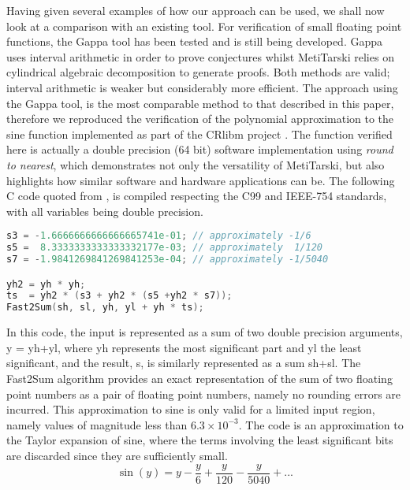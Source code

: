 \documentclass{fac}
\begin{document}
Having given several examples of how our approach can be used, we shall now look at a comparison with an existing tool. For verification of small floating point functions, the Gappa tool \cite{de2006assisted,boldo2009combining} has been tested and is still being developed. Gappa uses interval arithmetic in order to prove conjectures whilst MetiTarski relies on cylindrical algebraic decomposition to generate proofs. Both methods are valid; interval arithmetic is weaker but considerably more efficient. The approach using the Gappa tool, is the most comparable method to that described in this paper, therefore we reproduced the verification of the polynomial approximation to the sine function implemented as part of the CRlibm project \cite{daramy2009cr,5483294}. The function verified here is actually a double precision (64 bit) software implementation using \textit{round to nearest}, which demonstrates not only the versatility of MetiTarski, but also highlights how similar software and hardware applications can be. The following C code quoted from \cite{5483294}, is compiled respecting the C99 and IEEE-754 standards, with all variables being double precision. 

\begin{lstlisting}[language=C]
s3 = -1.6666666666666665741e-01; // approximately -1/6
s5 =  8.3333333333333332177e-03; // approximately  1/120
s7 = -1.9841269841269841253e-04; // approximately -1/5040

yh2 = yh * yh;
ts  = yh2 * (s3 + yh2 * (s5 +yh2 * s7));
Fast2Sum(sh, sl, yh, yl + yh * ts);
\end{lstlisting}

In this code, the input is represented as a sum of two double precision arguments, y = yh+yl, where yh represents the most significant part and yl the least significant, and the result, s, is similarly represented as a sum sh+sl. The Fast2Sum algorithm provides an exact representation of the sum of two floating point numbers as a pair of floating point numbers, namely no rounding errors are incurred. This approximation to sine is only valid for a limited input region, namely values of magnitude less than $6.3\times 10^{-3}$. The code is an approximation to the Taylor expansion of sine, where the terms involving the least significant bits are discarded since they are sufficiently small. 
\begin{equation}
    \sin{(y)} = y - \frac{y}{6} + \frac{y}{120} - \frac{y}{5040} + ... 
\end{equation}
\end{document}
